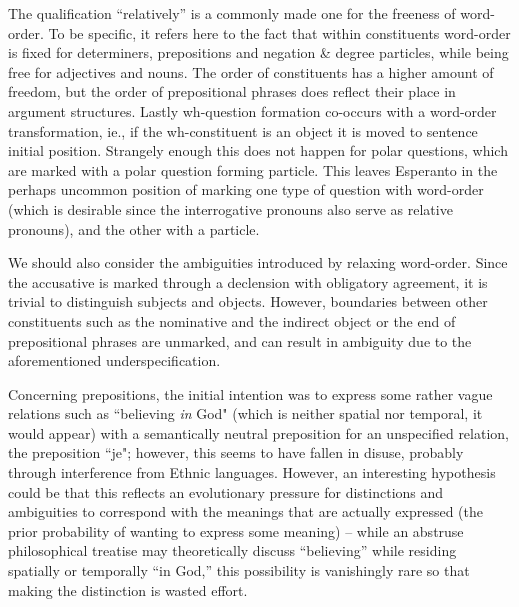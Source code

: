 \documentclass[10pt,a4paper]{article}
\begin{document}
The qualification ``relatively'' is a commonly made one for the freeness of
word-order. To be specific, it refers here to the fact that within
constituents word-order is fixed for determiners, prepositions and negation
\& degree particles, while being free for adjectives and nouns. The order of
constituents has a higher amount of freedom, but the order of prepositional
phrases does reflect their place in argument structures. Lastly wh-question formation
co-occurs with a word-order transformation, ie., if the wh-constituent is an
object it is moved to sentence initial position.  Strangely enough
this does not happen for polar questions, which are marked with a
polar question forming particle. This leaves Esperanto in the perhaps uncommon position
of marking one type of question with word-order (which is desirable since the
interrogative pronouns also serve as relative pronouns), and the other with a particle.

We should also consider the ambiguities introduced by relaxing word-order.
Since the accusative is marked through a declension with obligatory agreement,
it is trivial to distinguish subjects and objects. However, boundaries between
other constituents such as the nominative and the indirect object or the end of
prepositional phrases are unmarked, and can result in ambiguity due to the
aforementioned underspecification.

Concerning prepositions, the initial intention was to express some rather vague
relations such as ``believing {\em in} God" (which is neither spatial nor
temporal, it would appear) with a semantically neutral preposition for an
unspecified relation, the preposition ``je"; however, this seems to have fallen
in disuse, probably through interference from Ethnic languages. However, an
interesting hypothesis could be that this reflects an evolutionary pressure for
distinctions and ambiguities to correspond with the meanings that are actually
expressed (the prior probability of wanting to express some meaning) -- while
an abstruse philosophical treatise may theoretically discuss ``believing'' while
residing spatially or temporally ``in God,'' this possibility is vanishingly rare
so that making the distinction is wasted effort.
\end{document}
